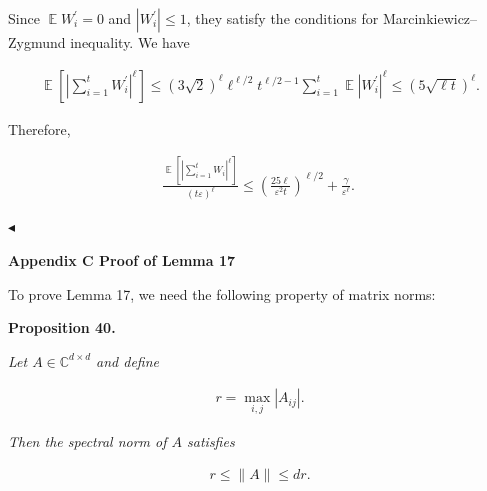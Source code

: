 \documentclass[10pt,a4paper]{article}
\begin{document}
Since $\operatorname*{\mathbb{E}}W_{i}^{\prime}=0$ and $|W_{i}^{\prime}|\leq 1$,
they satisfy the conditions for Marcinkiewicz–Zygmund inequality. We have\par


\[\begin{gathered}
\displaystyle\operatorname*{\mathbb{E}}\left[\left|\sum_{i=1}^{t}W_{i}^{\prime}\right|^{\ell}\right]\leq(3\sqrt{2})^{\ell}\ell^{\ell/2}t^{\ell/2-1}\sum_{i=1}^{t}\operatorname*{\mathbb{E}}|W_{i}^{\prime}|^{\ell}\leq(5\sqrt{\ell t})^{\ell}.
\end{gathered}\]


Therefore,\par


\[\begin{gathered}
\frac{\operatorname*{\mathbb{E}}\left[\left|\sum_{i=1}^{t}W_{i}\right|^{\ell}\right]}{(t\varepsilon)^{\ell}}\leq\left(\frac{25{\ell}}{\varepsilon^{2}{t}}\right)^{\ell/2}+\frac{\gamma}{\varepsilon^{\ell}}.\
\end{gathered}\]


$\blacktriangleleft$\par






\par\medskip\noindent\textbf{
Appendix C Proof of Lemma 17
}\par




To prove Lemma 17, we need the following property of matrix norms:\par





\par\medskip\noindent\textbf{
\textbf{Proposition 40}\textbf{.}
}\par



\emph{Let $A\in\mathbb{C}^{d\times d}$ and define}\par


\[\begin{gathered}
r=\max_{i,j}|A_{ij}|.
\end{gathered}\]


\emph{Then the spectral norm of $A$ satisfies}\par


\[\begin{gathered}
r\leq\|A\|\leq dr.
\end{gathered}\]
\end{document}
